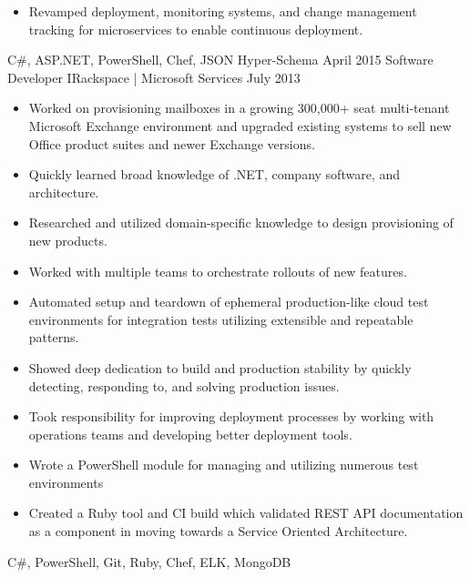\begin{experiences}
{\begin{itemize}
                        \item Revamped deployment, monitoring systems, and change management tracking for microservices to enable continuous deployment.
                      \end{itemize}
                    }
                    {C\#, ASP.NET, PowerShell, Chef, JSON Hyper-Schema}
\fi
  \emptySeparator
  \experience
  {April 2015}       {Software Developer I}{Rackspace | Microsoft Services}
  {July 2013}        {
                      \begin{itemize}
                        \item Worked on provisioning mailboxes in a growing 300,000+ seat multi-tenant Microsoft Exchange environment and upgraded existing systems to sell new Office product suites and newer Exchange versions.
                        \item Quickly learned broad knowledge of .NET, company software, and architecture.
                        \item Researched and utilized domain-specific knowledge to design provisioning of new products.
                        \ifcv
                        \item Worked with multiple teams to orchestrate rollouts of new features.
                        \item Automated setup and teardown of ephemeral production-like cloud test environments for integration tests utilizing extensible and repeatable patterns.
                        \item Showed deep dedication to build and production stability by quickly detecting, responding to, and solving production issues.
                        \item Took responsibility for improving deployment processes by working with operations teams and developing better deployment tools.
                        \item Wrote a PowerShell module for managing and utilizing numerous test environments
                        \item Created a Ruby tool and CI build which validated REST API documentation as a component in moving towards a Service Oriented Architecture.
                        \fi
                      \end{itemize}
                    }
                    {C\#, PowerShell, Git, Ruby, Chef, ELK, MongoDB}
\end{experiences}

